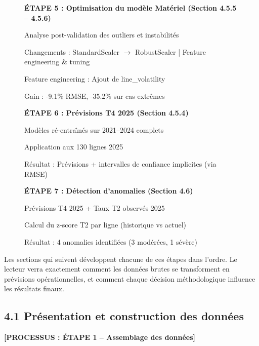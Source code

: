 \begin{figure}[H]
{\begin{minipage}{0.9\textwidth}
    \textbf{\'ETAPE 5 : Optimisation du mod\`ele Mat\'eriel (Section 4.5.5 -- 4.5.6)}
    
    Analyse post-validation des outliers et instabilit\'es
    
    Changements : StandardScaler $\rightarrow$ RobustScaler | Feature engineering \& tuning
    
    Feature engineering : Ajout de line\_volatility
    
    Gain : -9.1\% RMSE, -35.2\% sur cas extr\^emes
    
    \vspace{10pt}
    
    \textbf{\'ETAPE 6 : Pr\'evisions T4 2025 (Section 4.5.4)}
    
    Mod\`eles r\'e-entra\^{\i}n\'es sur 2021--2024 complets
    
    Application aux 130 lignes 2025
    
    R\'esultat : Pr\'evisions + intervalles de confiance implicites (via RMSE)
    
    \vspace{10pt}
    
    \textbf{\'ETAPE 7 : D\'etection d'anomalies (Section 4.6)}
    
    Pr\'evisions T4 2025 + Taux T2 observ\'es 2025
    
    Calcul du z-score T2 par ligne (historique vs actuel)
    
    R\'esultat : 4 anomalies identifi\'ees (3 mod\'er\'ees, 1 s\'ev\`ere)
    
    \end{minipage}}
\end{figure}

\noindent
Les sections qui suivent d\'eveloppent chacune de ces \'etapes dans l'ordre. Le lecteur
verra exactement comment les donn\'ees brutes se transforment en pr\'evisions
op\'erationnelles, et comment chaque d\'ecision m\'ethodologique influence les
r\'esultats finaux.

\subsection*{4.1 \quad Pr\'esentation et construction des donn\'ees}

\textbf{[PROCESSUS : \'ETAPE 1 -- Assemblage des donn\'ees]}

